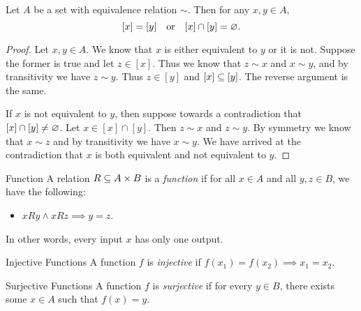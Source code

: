 \documentclass[class=article, crop=false]{standalone}
\begin{document}
  Let $A$ be a set with equivalence relation $\sim$. Then for any $x, y\in A$,
  \[
    [x] = [y] \quad\text{or}\quad [x] \cap [y] = \varnothing.
  \]
  \begin{proof}
    Let $x, y\in A$. We know that $x$ is either equivalent to $y$ or it is not. Suppose the former is true and let $z\in [x]$. Thus we know that $z\sim x$ and $x\sim y$, and by transitivity we have $z\sim y$. Thus $z\in [y]$ and $[x]\subseteq[y]$. The reverse argument is the same. \par
    If $x$ is not equivalent to $y$, then suppose towards a contradiction that $[x] \cap [y] \neq \varnothing$. Let $x\in [x] \cap [y]$. Then $z\sim x$ and $z\sim y$. By symmetry we know that $x\sim z$ and by transitivity we have $x\sim y$. We have arrived at the contradiction that $x$ is both equivalent and not equivalent to $y$.
  \end{proof}
  \begin{definition}{Function}
    A relation $R\subseteq A\times B$ is a \emph{function} if for all $x\in A$ and all $y, z\in B$, we have the following:
    \begin{itemize}
      \item $xRy\land xRz\implies y = z$.
    \end{itemize}
    In other words, every input $x$ has only one output.
  \end{definition}
  \begin{definition}{Injective Functions}
    A function $f$ is \emph{injective} if $f(x_1) = f(x_2)\implies x_1 = x_2$.
  \end{definition}
  \begin{definition}{Surjective Functions}
    A function $f$ is \emph{surjective} if for every $y\in B$, there exists some $x\in A$ such that $f(x) = y$.
  \end{definition}
\end{document}
